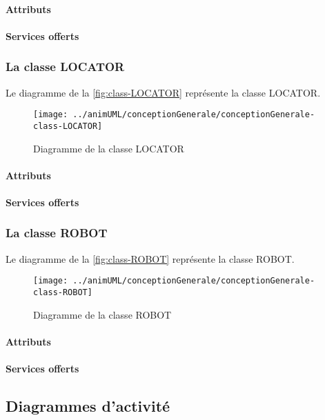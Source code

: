 \paragraph{Attributs}
\classMAPPERProperties
\paragraph{Services offerts}
\classMAPPEROperations
\subsubsection{La classe LOCATOR}

Le diagramme de la \autoref{fig:class-LOCATOR} représente la classe LOCATOR.
\begin{figure}[H]
	\centering
	\texttt{[image: ../animUML/conceptionGenerale/conceptionGenerale-class-LOCATOR]}
	\caption{Diagramme de la classe LOCATOR}
	\label{fig:class-LOCATOR}
\end{figure}


\paragraph{Attributs}
\classLOCATORProperties
\paragraph{Services offerts}
\classLOCATOROperations
\subsubsection{La classe ROBOT}

Le diagramme de la \autoref{fig:class-ROBOT} représente la classe ROBOT.
\begin{figure}[H]
	\centering
	\texttt{[image: ../animUML/conceptionGenerale/conceptionGenerale-class-ROBOT]}
	\caption{Diagramme de la classe ROBOT}
	\label{fig:class-ROBOT}
\end{figure}


\paragraph{Attributs}
\classROBOTProperties
\paragraph{Services offerts}
\classROBOTOperations

\subsection{Diagrammes d'activité}

